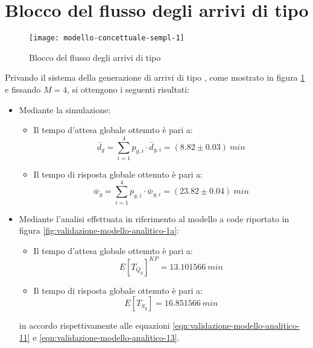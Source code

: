 \section{Blocco del flusso degli arrivi di tipo \sr{}}
\begin{figure}[ht]
\centering
\texttt{[image: modello-concettuale-sempl-1]}
\caption{Blocco del flusso degli arrivi di tipo \sr{}}
\label{fig:modello-concettuale-semp-1}
\end{figure}
Privando il sistema della generazione di arrivi di tipo \sr{}, come mostrato in figura \ref{fig:modello-concettuale-semp-1} e fissando $M=4$, si ottengono i seguenti risultati:
\begin{itemize}
\item Mediante la simulazione:
\begin{itemize}
\item Il tempo d'attesa globale ottenuto è pari a:
\begin{equation} 
\bar{d}_g = \sum_{i = 1}^4 p_{g,i}\cdot \bar{d}_{g,i} = (8.82 \pm 0.03)\ min
\end{equation}
\item Il tempo di risposta globale ottenuto è pari a:
\begin{equation}
\bar{w}_g = \sum_{i = 1}^4 p_{g,i}\cdot \bar{w}_{g,i} = (23.82 \pm 0.04)\ min
\end{equation}
\end{itemize}

\item Mediante l'analisi effettuata in riferimento al modello a code riportato in figura \ref{fig:validazione-modello-analitico-1a}:
\begin{itemize}
\item Il tempo d'attesa globale ottenuto è pari a:
\begin{equation}
E[T_{Q_g}]^{KP} = 13.101566\ min 
\end{equation}
\item Il tempo di risposta globale ottenuto è pari a:
\begin{equation}
E[T_{S_g}] = 16.851566\ min 
\end{equation}
\end{itemize}
in accordo rispettivamente alle equazioni \ref{eqn:validazione-modello-analitico-11} e \ref{eqn:validazione-modello-analitico-13}.
\end{itemize}

